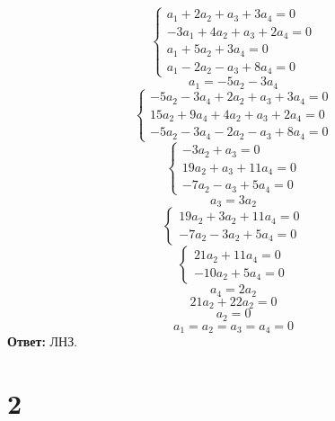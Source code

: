 $$
\begin{cases}
	a_1 + 2a_2 + a_3 + 3a_4 = 0 \\
    -3a_1 + 4a_2 + a_3 + 2a_4 = 0 \\
    a_1 + 5a_2 + 3a_4 = 0 \\
    a_1 - 2a_2 - a_3 + 8a_4 = 0
\end{cases} $$
$$ a_1 = -5a_2 - 3a_4 $$
$$
\begin{cases}
	-5a_2 - 3a_4 + 2a_2 + a_3 + 3a_4 = 0 \\
    15a_2 + 9a_4 + 4a_2 + a_3 + 2a_4 = 0 \\
    -5a_2 - 3a_4 - 2a_2 - a_3 + 8a_4 = 0
\end{cases} $$
$$
\begin{cases}
	-3a_2 + a_3 = 0 \\
    19a_2 + a_3 + 11a_4 = 0 \\
    -7a_2 - a_3 + 5a_4 = 0
\end{cases} $$
$$ a_3 = 3a_2 $$
$$
\begin{cases}
	19a_2 + 3a_2 + 11a_4 = 0 \\
    -7a_2 - 3a_2 + 5a_4 = 0
\end{cases} $$
$$
\begin{cases}
	21a_2 + 11a_4 = 0 \\
    -10a_2 + 5a_4 = 0
\end{cases} $$
$$ a_4 = 2a_2 $$
$$ 21a_2 + 22a_2 = 0 $$
$$ a_2 = 0 $$
$$ a_1 = a_2 = a_3 = a_4 = 0 $$
\textbf{Ответ:} ЛНЗ.

\section{2}

